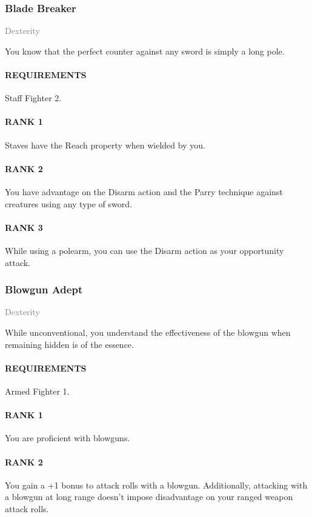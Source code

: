 \subsubsection{Blade Breaker} \label{feat::bladebreaker}
\small{\textcolor{gray}{Dexterity}}

\normalsize
You know that the perfect counter against any sword is simply a long pole.
\paragraph{REQUIREMENTS} Staff Fighter 2.
\paragraph{RANK 1} Staves have the Reach property when wielded by you.
\paragraph{RANK 2} You have advantage on the Disarm action and the Parry technique against creatures using any type of sword.
\paragraph{RANK 3} While using a polearm, you can use the Disarm action as your opportunity attack.

\subsubsection{Blowgun Adept} \label{feat::blowgunadept}
\small{\textcolor{gray}{Dexterity}}

\normalsize
While unconventional, you understand the effectiveness of the blowgun when remaining hidden is of the essence.
\paragraph{REQUIREMENTS} Armed Fighter 1.
\paragraph{RANK 1} You are proficient with blowguns.
\paragraph{RANK 2} You gain a +1 bonus to attack rolls with a blowgun.
Additionally, attacking with a blowgun at long range doesn't impose disadvantage on your ranged weapon attack rolls.

